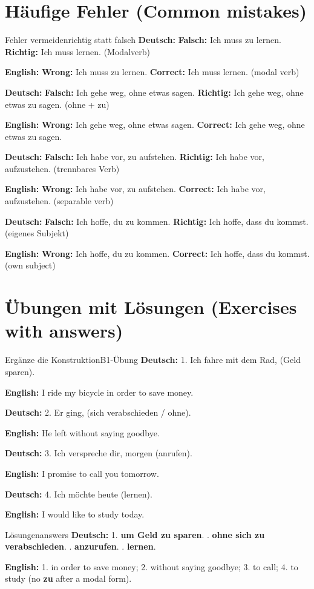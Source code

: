 \documentclass[a4paper,11pt]{article}
\newcommand{\GermanText}[1]{\textbf{Deutsch: }#1\par}
\newcommand{\EnglishText}[1]{{\small\color{SoftGray}\textbf{English: }#1\par}}
\begin{document}
\section{Häufige Fehler \textnormal{(Common mistakes)}}
\begin{grammarentry}{Fehler vermeiden}{richtig statt falsch}
\GermanText{\textbf{Falsch:} Ich muss zu lernen. \quad \textbf{Richtig:} Ich muss lernen. (Modalverb)}
\EnglishText{\textbf{Wrong:} Ich muss zu lernen. \quad \textbf{Correct:} Ich muss lernen. (modal verb)}
\GermanText{\textbf{Falsch:} Ich gehe weg, ohne etwas sagen. \quad \textbf{Richtig:} Ich gehe weg, ohne etwas zu sagen. (ohne + zu)}
\EnglishText{\textbf{Wrong:} Ich gehe weg, ohne etwas sagen. \quad \textbf{Correct:} Ich gehe weg, ohne etwas zu sagen.}
\GermanText{\textbf{Falsch:} Ich habe vor, zu aufstehen. \quad \textbf{Richtig:} Ich habe vor, aufzustehen. (trennbares Verb)}
\EnglishText{\textbf{Wrong:} Ich habe vor, zu aufstehen. \quad \textbf{Correct:} Ich habe vor, aufzustehen. (separable verb)}
\GermanText{\textbf{Falsch:} Ich hoffe, du zu kommen. \quad \textbf{Richtig:} Ich hoffe, dass du kommst. (eigenes Subjekt)}
\EnglishText{\textbf{Wrong:} Ich hoffe, du zu kommen. \quad \textbf{Correct:} Ich hoffe, dass du kommst. (own subject)}
\end{grammarentry}

\section{Übungen mit Lösungen \textnormal{(Exercises with answers)}}
\begin{grammarentry}{Ergänze die Konstruktion}{B1-Übung}
\GermanText{1. Ich fahre mit dem Rad, \underline{\hspace{4cm}} (Geld sparen).}
\EnglishText{I ride my bicycle in order to save money.}
\GermanText{2. Er ging, \underline{\hspace{4cm}} (sich verabschieden / ohne).}
\EnglishText{He left without saying goodbye.}
\GermanText{3. Ich verspreche dir, morgen \underline{\hspace{3cm}} (anrufen).}
\EnglishText{I promise to call you tomorrow.}
\GermanText{4. Ich möchte heute \underline{\hspace{3cm}} (lernen).}
\EnglishText{I would like to study today.}
\end{grammarentry}
\begin{grammarentry}{Lösungen}{answers}
\GermanText{1. \textbf{um Geld zu sparen}. . \textbf{ohne sich zu verabschieden}. \quad 3. \textbf{anzurufen}. \quad 4. \textbf{lernen}.}
\EnglishText{1. in order to save money; 2. without saying goodbye; 3. to call; 4. to study (no \textbf{zu} after a modal form).}
\end{grammarentry}
\end{document}
